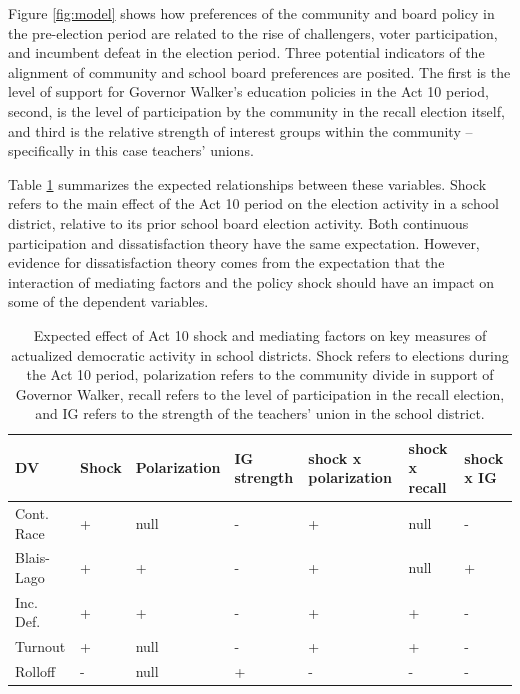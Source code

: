Figure \ref{fig:model} shows how preferences of the community and board policy in the pre-election period 
are related to the rise of challengers, voter participation, and incumbent defeat 
in the election period. Three potential indicators of the alignment of community 
and school board preferences are posited. The first is the level of support for 
Governor Walker's education policies in the Act 10 period, second, is the level of 
participation by the community in the recall election itself, and third is the relative 
strength of interest groups within the community -- specifically in this case teachers' 
unions. 

Table \ref{tab:act10hypo} summarizes the expected relationships between these 
variables. Shock refers to the main effect of the Act 10 period on the election 
activity in a school district, relative to its prior school board election 
activity. Both continuous participation and dissatisfaction theory have the 
same expectation. However, evidence for dissatisfaction theory comes from the 
expectation that the interaction of mediating factors and the policy shock should have 
an impact on some of the dependent variables. 


\begin{table}[h!]
\begin{center}
\begin{small}
\caption[Expected Effects of Act 10 Period and Mediating Factors on Actualized 
Democracy]{Expected effect of Act 10 shock and mediating factors on key measures 
of actualized democratic activity in school districts. Shock refers to elections 
during the Act 10 period, polarization refers to the community divide in support 
of Governor Walker, recall refers to the level of participation in the recall 
election, and IG refers to the strength of the teachers' union in the school 
district.}
\label{tab:act10hypo}
\begin{tabular}{| p{} | p{} | p{} | 
 p{} | p{} | p{} | p{} |} \hline
DV & Shock & Polarization & IG strength & shock x polarization & shock x recall & shock x IG \\ \hline
Cont. Race & + & null & - & + & null & - \\ \hline
Blais-Lago & + & +    & - & + & null & + \\ \hline
Inc. Def.  & + & +    & - & + & +    & - \\ \hline 
Turnout    & + & null & - & + & +    & - \\ \hline
Rolloff    & - & null & + & - & -    & - \\ \hline
\end{tabular}
\end{small}
\end{center}
\end{table}



